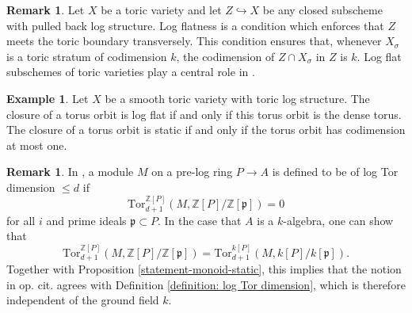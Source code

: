 \documentclass[11pt]{amsart}
\theoremstyle{definition}
\theoremstyle{definition}
\newtheorem{remark}[theorem]{Remark}
\newtheorem{example}[theorem]{Example}
\begin{document}
\begin{remark}\label{ex:YesLogFlat}
    Let $X$ be a toric variety and let $Z\hookrightarrow X$ be any closed subscheme with pulled back log structure. Log flatness is a condition which enforces that $Z$ meets the toric boundary transversely. This condition ensures that, whenever $X_\sigma$ is a toric stratum of codimension $k$, the codimension of $Z\cap X_\sigma$ in $Z$ is $k$. Log flat subschemes of toric varieties play a central role in \cite{kennedy2023logarithmic,kennedy2025logarithmic,maulik2024logarithmic,tevelev2005compactifications}.
\end{remark}

\begin{example}
    Let $X$ be a smooth toric variety with toric log structure. The closure of a torus orbit is log flat if and only if this torus orbit is the dense torus. The closure of a torus orbit is static if and only if the torus orbit has codimension at most one.
\end{example}
\begin{remark}
In \cite{GabberToricFlattening, gabber2018foundationsringtheory,on-toric-log-schemes}, a module $M$ on a pre-log ring $P\rightarrow A$ is defined to be of 
log Tor dimension $\leq d$ if 
\[
    \text{Tor}_{d+1}^{\mathbb{Z}[P]}(M,\mathbb{Z}[P]/\mathbb{Z}[\mathfrak{p}])=0
\]
for all $i$ and prime ideals $\mathfrak{p}\subset P$. In the case that $A$ is a $k$-algebra, one can show that 
\[
    \text{Tor}_{d+1}^{\mathbb{Z}[P]}(M,\mathbb{Z}[P]/\mathbb{Z}[\mathfrak{p}]) = \text{Tor}_{d+1}^{k[P]}(M,k[P]/k[\mathfrak{p}]).
\]
Together with Proposition \ref{statement-monoid-static}, this implies that the notion in op. cit. agrees with Definition \ref{definition: log Tor dimension}, which is therefore independent of the ground field $k$.
\end{remark}
\end{document}
